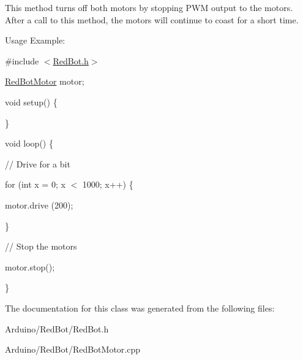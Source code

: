 This method turns off both motors by stopping P\-W\-M output to the motors. After a call to this method, the motors will continue to coast for a short time.

Usage Example\-:

\#include $<$\hyperlink{_red_bot_8h_source}{Red\-Bot.\-h}$>$

\hyperlink{class_red_bot_motor}{Red\-Bot\-Motor} motor;

void setup() \{

\}

void loop() \{

// Drive for a bit

for (int x = 0; x $<$ 1000; x++) \{

motor.\-drive (200);

\}

// Stop the motors

motor.\-stop();

\} 

The documentation for this class was generated from the following files\-:\begin{DoxyCompactItemize}
\item 
Arduino/\-Red\-Bot/Red\-Bot.\-h\item 
Arduino/\-Red\-Bot/Red\-Bot\-Motor.\-cpp\end{DoxyCompactItemize}
